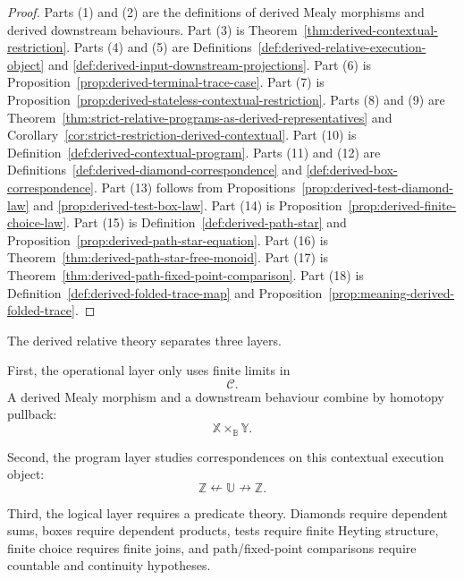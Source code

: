 \begin{proof}
Parts (1) and (2) are the definitions of derived Mealy morphisms and derived
downstream behaviours. Part (3) is
Theorem~\ref{thm:derived-contextual-restriction}. Parts (4) and (5) are
Definitions~\ref{def:derived-relative-execution-object} and
\ref{def:derived-input-downstream-projections}. Part (6) is
Proposition~\ref{prop:derived-terminal-trace-case}. Part (7) is
Proposition~\ref{prop:derived-stateless-contextual-restriction}. Parts (8)
and (9) are Theorem~\ref{thm:strict-relative-programs-as-derived-representatives}
and Corollary~\ref{cor:strict-restriction-derived-contextual}. Part (10) is
Definition~\ref{def:derived-contextual-program}. Parts (11) and (12) are
Definitions~\ref{def:derived-diamond-correspondence} and
\ref{def:derived-box-correspondence}. Part (13) follows from
Propositions~\ref{prop:derived-test-diamond-law} and
\ref{prop:derived-test-box-law}. Part (14) is
Proposition~\ref{prop:derived-finite-choice-law}. Part (15) is
Definition~\ref{def:derived-path-star} and
Proposition~\ref{prop:derived-path-star-equation}. Part (16) is
Theorem~\ref{thm:derived-path-star-free-monoid}. Part (17) is
Theorem~\ref{thm:derived-path-fixed-point-comparison}. Part (18) is
Definition~\ref{def:derived-folded-trace-map} and
Proposition~\ref{prop:meaning-derived-folded-trace}.
\end{proof}

\begin{remark}
\label{rem:derived-relative-hierarchy}
The derived relative theory separates three layers.

First, the operational layer only uses finite limits in
\[
\mathcal C.
\]
A derived Mealy morphism and a downstream behaviour combine by homotopy
pullback:
\[
\mathbb X\times_{\mathbb B}\mathbb Y.
\]

Second, the program layer studies correspondences on this contextual execution
object:
\[
\mathbb Z\nleftarrow \mathbb U\nrightarrow \mathbb Z.
\]

Third, the logical layer requires a predicate theory. Diamonds require
dependent sums, boxes require dependent products, tests require finite
Heyting structure, finite choice requires finite joins, and path/fixed-point
comparisons require countable and continuity hypotheses.
\end{remark}

